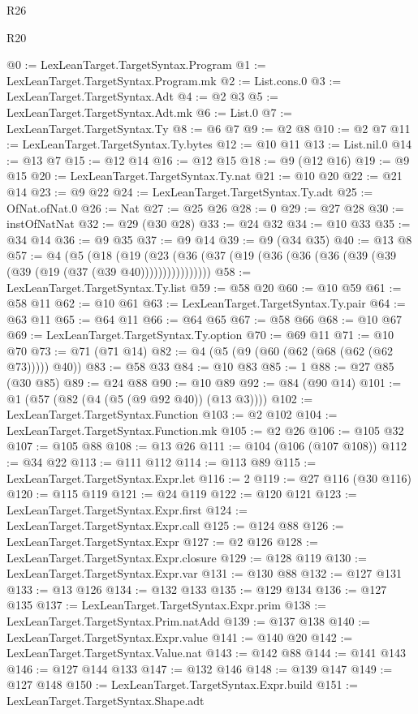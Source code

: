 \begin{lexlean}{R26}
\begin{lexlean}{R20}
\begin{coremodule}
{{{{{{{{{{{{{{{{{{{{{{{{{{{{{{{{{{{{{{{{{{{{{{{{{{{{{{{{{{{{{{{@0 := LexLeanTarget.TargetSyntax.Program
@1 := LexLeanTarget.TargetSyntax.Program.mk
@2 := List.cons.{0}
@3 := LexLeanTarget.TargetSyntax.Adt
@4 := @2 @3
@5 := LexLeanTarget.TargetSyntax.Adt.mk
@6 := List.{0}
@7 := LexLeanTarget.TargetSyntax.Ty
@8 := @6 @7
@9 := @2 @8
@10 := @2 @7
@11 := LexLeanTarget.TargetSyntax.Ty.bytes
@12 := @10 @11
@13 := List.nil.{0}
@14 := @13 @7
@15 := @12 @14
@16 := @12 @15
@18 := @9 (@12 @16)
@19 := @9 @15
@20 := LexLeanTarget.TargetSyntax.Ty.nat
@21 := @10 @20
@22 := @21 @14
@23 := @9 @22
@24 := LexLeanTarget.TargetSyntax.Ty.adt
@25 := OfNat.ofNat.{0}
@26 := Nat
@27 := @25 @26
@28 := 0
@29 := @27 @28
@30 := instOfNatNat
@32 := @29 (@30 @28)
@33 := @24 @32
@34 := @10 @33
@35 := @34 @14
@36 := @9 @35
@37 := @9 @14
@39 := @9 (@34 @35)
@40 := @13 @8
@57 := @4
    (@5
      (@18 (@19 (@23 (@36 (@37 (@19 (@36 (@36 (@36 (@39 (@39 (@39 (@19 (@37 (@39 @40))))))))))))))))
@58 := LexLeanTarget.TargetSyntax.Ty.list
@59 := @58 @20
@60 := @10 @59
@61 := @58 @11
@62 := @10 @61
@63 := LexLeanTarget.TargetSyntax.Ty.pair
@64 := @63 @11
@65 := @64 @11
@66 := @64 @65
@67 := @58 @66
@68 := @10 @67
@69 := LexLeanTarget.TargetSyntax.Ty.option
@70 := @69 @11
@71 := @10 @70
@73 := @71 (@71 @14)
@82 := @4 (@5 (@9 (@60 (@62 (@68 (@62 (@62 @73))))) @40))
@83 := @58 @33
@84 := @10 @83
@85 := 1
@88 := @27 @85 (@30 @85)
@89 := @24 @88
@90 := @10 @89
@92 := @84 (@90 @14)
@101 := @1 (@57 (@82 (@4 (@5 (@9 @92 @40)) (@13 @3))))
@102 := LexLeanTarget.TargetSyntax.Function
@103 := @2 @102
@104 := LexLeanTarget.TargetSyntax.Function.mk
@105 := @2 @26
@106 := @105 @32
@107 := @105 @88
@108 := @13 @26
@111 := @104 (@106 (@107 @108))
@112 := @34 @22
@113 := @111 @112
@114 := @113 @89
@115 := LexLeanTarget.TargetSyntax.Expr.let
@116 := 2
@119 := @27 @116 (@30 @116)
@120 := @115 @119
@121 := @24 @119
@122 := @120 @121
@123 := LexLeanTarget.TargetSyntax.Expr.first
@124 := LexLeanTarget.TargetSyntax.Expr.call
@125 := @124 @88
@126 := LexLeanTarget.TargetSyntax.Expr
@127 := @2 @126
@128 := LexLeanTarget.TargetSyntax.Expr.closure
@129 := @128 @119
@130 := LexLeanTarget.TargetSyntax.Expr.var
@131 := @130 @88
@132 := @127 @131
@133 := @13 @126
@134 := @132 @133
@135 := @129 @134
@136 := @127 @135
@137 := LexLeanTarget.TargetSyntax.Expr.prim
@138 := LexLeanTarget.TargetSyntax.Prim.natAdd
@139 := @137 @138
@140 := LexLeanTarget.TargetSyntax.Expr.value
@141 := @140 @20
@142 := LexLeanTarget.TargetSyntax.Value.nat
@143 := @142 @88
@144 := @141 @143
@146 := @127 @144 @133
@147 := @132 @146
@148 := @139 @147
@149 := @127 @148
@150 := LexLeanTarget.TargetSyntax.Expr.build
@151 := LexLeanTarget.TargetSyntax.Shape.adt
}}}}}}}}}}}}}}}}}}}}}}}}}}}}}}}}}}}}}}}}}}}}}}}}}}}}}}}}}}}}}}}
\end{coremodule}
\end{lexlean}
\end{lexlean}
